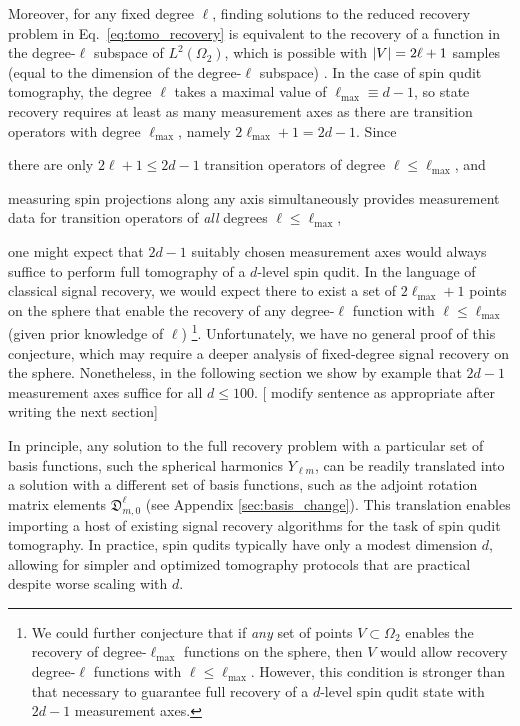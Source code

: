 \documentclass[notitlepage,twocolumn]{revtex4-2}
\renewcommand{\t}{\text} %
\newcommand{\p}[1]{\left(#1\right)} %
\newcommand{\1}{\mathds{1}}
\newcommand{\D}{\mathfrak{D}}
\newcommand{\red}[1]{{\color{red} #1}}
\begin{document}
Moreover, for any fixed degree $\ell$, finding solutions to the reduced recovery problem in Eq.~\eqref{eq:tomo_recovery} is equivalent to the recovery of a function in the degree-$\ell$ subspace of $L^2\p{\Omega_2}$, which is possible with $\abs{V}=2\ell+1$ samples (equal to the dimension of the degree-$\ell$ subspace) \cite{freeden2008spherical}.
In the case of spin qudit tomography, the degree $\ell$ takes a maximal value of $\ell_{\t{max}}\equiv d-1$, so state recovery requires at least as many measurement axes as there are transition operators with degree $\ell_{\t{max}}$, namely $2\ell_{\t{max}}+1=2d-1$.
Since
\begin{enumerate*}
\item there are only $2\ell+1\le2d-1$ transition operators of degree $\ell\le\ell_{\t{max}}$, and
\item measuring spin projections along any axis simultaneously provides measurement data for transition operators of {\it all} degrees $\ell\le\ell_{\t{max}}$,
\end{enumerate*}
one might expect that $2d-1$ suitably chosen measurement axes would always suffice to perform full tomography of a $d$-level spin qudit.
In the language of classical signal recovery, we would expect there to exist a set of $2\ell_{\t{max}}+1$ points on the sphere that enable the recovery of any degree-$\ell$ function with $\ell\le\ell_{\t{max}}$ (given prior knowledge of $\ell$) \footnote{We could further conjecture that if {\it any} set of points $V\subset\Omega_2$ enables the recovery of degree-$\ell_{\t{max}}$ functions on the sphere, then $V$ would allow recovery degree-$\ell$ functions with $\ell\le\ell_{\t{max}}$.  However, this condition is stronger than that necessary to guarantee full recovery of a $d$-level spin qudit state with $2d-1$ measurement axes.}.
Unfortunately, we have no general proof of this conjecture, which may require a deeper analysis of fixed-degree signal recovery on the sphere.
Nonetheless, in the following section we show by example that $2d-1$ measurement axes suffice for all $d\le100$. [\red{modify sentence as appropriate after writing the next section}]

In principle, any solution to the full recovery problem with a particular set of basis functions, such the spherical harmonics $Y_{\ell m}$, can be readily translated into a solution with a different set of basis functions, such as the adjoint rotation matrix elements $\D^\ell_{m,0}$ (see Appendix \ref{sec:basis_change}).
This translation enables importing a host of existing signal recovery algorithms \cite{mcewen2011novel, mcewen2011sampling, rauhut2011sparse, alem2012sparse, khalid2014optimaldimensionality} for the task of spin qudit tomography.
In practice, spin qudits typically have only a modest dimension $d$, allowing for simpler and optimized tomography protocols that are practical despite worse scaling with $d$.
\end{document}

